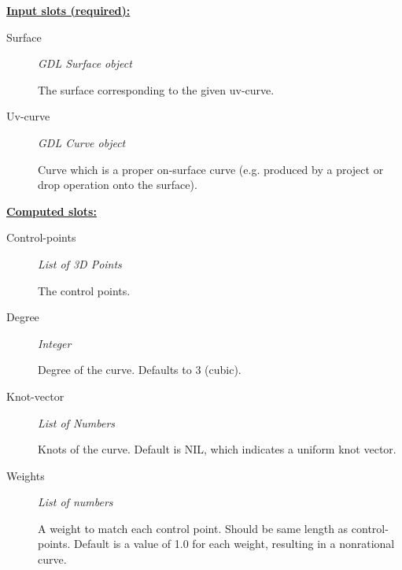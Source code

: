 \documentclass [11pt]{book}
\begin{document}
\begin{itemize}
\begin{description}
\end{description}








\textbf{
\underline{Input slots (required):}}

\begin{description}

\item [Surface]
\emph{GDL Surface object}

 The surface corresponding to the given uv-curve.




\item [Uv-curve]
\emph{GDL Curve object}

 Curve which is a proper on-surface
curve (e.g. produced by a project or drop operation
onto the surface).




\end{description}






\textbf{
\underline{Computed slots:}}

\begin{description}

\item [Control-points]
\emph{List of 3D Points}

 The control points.




\item [Degree]
\emph{Integer}

 Degree of the curve. Defaults to 3 (cubic).




\item [Knot-vector]
\emph{List of Numbers}

 Knots of the curve. Default is NIL, which indicates a uniform knot vector.




\item [Weights]
\emph{List of numbers}

 A weight to match each control point. Should be same length as control-points.
Default is a value of 1.0 for each weight, resulting in a nonrational curve.





\end{description}
\end{itemize}
\end{document}
